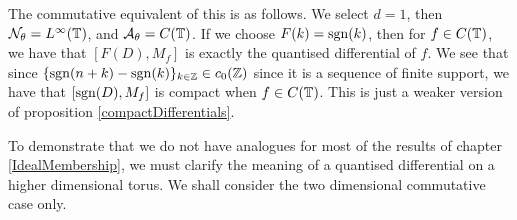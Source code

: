 \begin{remark}
    The commutative equivalent of this is as follows. We select $d = 1$,
    then $\mathcal{N}_\theta = L^\infty(\mathbb{T})$, and $\mathcal{A}_\theta = C(\mathbb{T})$.
    If we choose $F(k) = \operatorname{sgn}(k)$, then for $f \in C(\mathbb{T})$, we
    have that $[F(D),M_f]$ is exactly the quantised differential of $f$.
    We see that since $\{\operatorname{sgn}(n+k)-\operatorname{sgn}(k)\}_{k \in \mathbb{Z}} \in c_0(\mathbb{Z})$
    since it is a sequence of finite support, we have that $[\operatorname{sgn}(D),M_f]$
    is compact when $f \in C(\mathbb{T})$. This is just a weaker version of proposition \ref{compactDifferentials}.
\end{remark}

To demonstrate that we do not have
analogues for most
of the results
of chapter \ref{IdealMembership}, we must clarify the meaning of a quantised differential
on a higher dimensional torus. We shall consider the two dimensional commutative case only.
